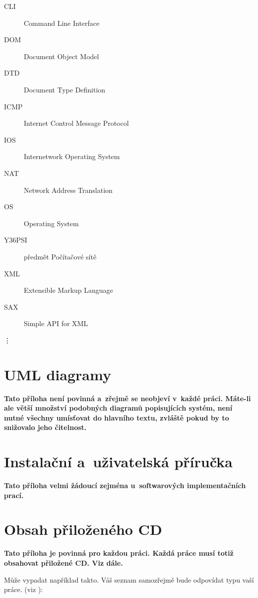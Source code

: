 \documentclass[11pt,twoside,a4paper]{book}
\begin{document}
\begin{description}
\item[CLI] Command Line Interface
\item[DOM] Document Object Model
\item[DTD] Document Type Definition
\item[ICMP] Internet Control Message Protocol
\item[IOS] Internetwork Operating System
\item[NAT] Network Address Translation
\item[OS] Operating System
\item[Y36PSI] předmět Počítačové sítě
\item[XML] Extensible Markup Language

\item [SAX] Simple API for XML
\end{description}
\vdots

\chapter{UML diagramy}
\textbf{\large Tato příloha není povinná a~zřejmě se neobjeví v~každé práci. Máte-li ale větší množství podobných
diagramů popisujících systém, není nutné všechny umísťovat do hlavního textu, zvláště pokud by to snižovalo jeho
čitelnost.}

\chapter{Instalační a~uživatelská příručka}
\textbf{\large Tato příloha velmi žádoucí zejména u~softwarových implementačních prací.}

\chapter{Obsah přiloženého CD}
\textbf{\large Tato příloha je povinná pro každou práci. Každá práce musí totiž obsahovat přiložené CD. Viz dále.}

Může vypadat například takto. Váš seznam samozřejmě bude odpovídat typu vaší práce. (viz \cite{infodp}):
\end{document}
